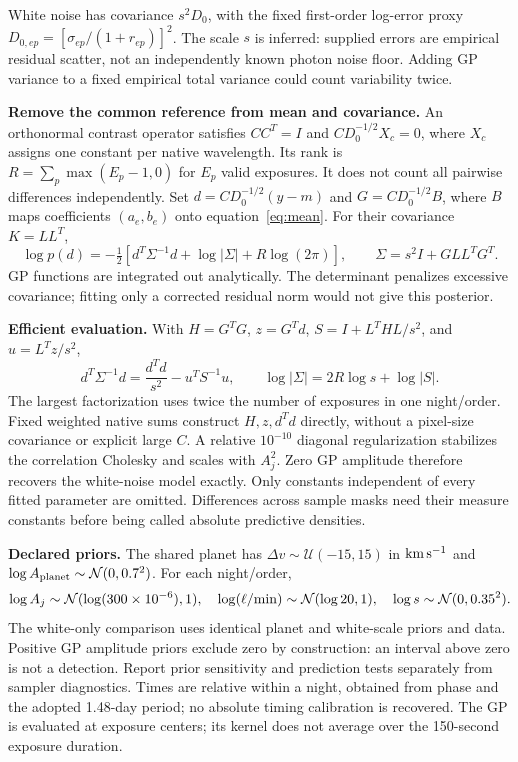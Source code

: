 \documentclass[10pt,a4paper]{article}
\begin{document}
White noise has covariance $s^2D_0$, with the fixed first-order log-error proxy
$D_{0,ep}=[\sigma_{ep}/(1+r_{ep})]^2$. The scale $s$ is inferred: supplied
errors are empirical residual scatter, not an independently known photon
noise floor. Adding GP variance to a fixed empirical total variance could
count variability twice.

\textbf{Remove the common reference from mean and covariance.}
An orthonormal contrast operator satisfies $CC^T=I$ and
$CD_0^{-1/2}X_c=0$, where $X_c$ assigns one constant per native wavelength.
Its rank is $R=\sum_p\max(E_p-1,0)$ for $E_p$ valid exposures. It does not count
all pairwise differences independently. Set $d=CD_0^{-1/2}(y-m)$ and
$G=CD_0^{-1/2}B$, where $B$ maps coefficients $(a_e,b_e)$ onto
 equation~\eqref{eq:mean}. For their covariance $K=LL^T$,
\begin{equation}
\log p(d)=-\tfrac12\left[d^T\Sigma^{-1}d+\log|\Sigma|+R\log(2\pi)\right],
\qquad\Sigma=s^2I+GLL^TG^T.
\label{eq:likelihood}
\end{equation}
GP functions are integrated out analytically. The determinant penalizes
excessive covariance; fitting only a corrected residual norm would not give
this posterior.

\newpage
\textbf{Efficient evaluation.}
With $H=G^TG$, $z=G^Td$, $S=I+L^THL/s^2$, and $u=L^Tz/s^2$,
\begin{equation}
d^T\Sigma^{-1}d=\frac{d^Td}{s^2}-u^TS^{-1}u,\qquad
\log|\Sigma|=2R\log s+\log|S|.
\label{eq:woodbury}
\end{equation}
The largest factorization uses twice the number of exposures in one
night/order. Fixed weighted native sums construct $H,z,d^Td$ directly,
without a pixel-size covariance or explicit large $C$.
A relative $10^{-10}$ diagonal regularization stabilizes the correlation
Cholesky and scales with $A_j^2$. Zero GP amplitude therefore recovers the
white-noise model exactly. Only constants independent of every fitted
parameter are omitted. Differences across sample masks need their measure
constants before being called absolute predictive densities.

\textbf{Declared priors.}
The shared planet has $\Delta v\sim\mathcal U(-15,15)$ in
${\rm km\,s^{-1}}$ and $\log A_{\rm planet}\sim\mathcal N(0,0.7^2)$.
For each night/order,
\begin{equation}
\log A_j\sim\mathcal N(\log(300\times10^{-6}),1),\quad
\log(\ell/{\rm min})\sim\mathcal N(\log20,1),\quad
\log s\sim\mathcal N(0,0.35^2).
\end{equation}
The white-only comparison uses identical planet and white-scale priors and
data. Positive GP amplitude priors exclude zero by construction: an interval
above zero is not a detection. Report prior sensitivity and prediction tests
separately from sampler diagnostics. Times are relative within a night,
obtained from phase and the adopted 1.48-day period; no absolute timing
calibration is recovered.
The GP is evaluated at exposure centers; its kernel does not average over
the 150-second exposure duration.
\end{document}
